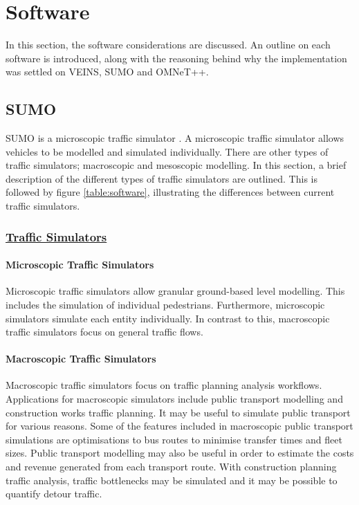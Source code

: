 \section{Software}
In this section, the software considerations are discussed. An outline on each software is introduced, along with the reasoning behind why the implementation was settled on VEINS, SUMO and OMNeT++.

\subsection{SUMO}\label{ssec:SUMO_SOFTWARE}
SUMO is a microscopic traffic simulator \citep{SUMO2012}. A microscopic traffic simulator allows vehicles to be modelled and simulated individually. There are other types of traffic simulators; macroscopic and mesoscopic modelling. In this section, a brief description of the different types of traffic simulators are outlined. This is followed by figure \ref{table:software}, illustrating the differences between current traffic simulators.

\subsubsection{\underline{Traffic Simulators}}
\paragraph{Microscopic Traffic Simulators}
Microscopic traffic simulators allow granular ground-based level modelling. This includes the simulation of individual pedestrians. Furthermore, microscopic simulators simulate each entity individually. In contrast to this, macroscopic traffic simulators focus on general traffic flows. 

\paragraph{Macroscopic Traffic Simulators}
Macroscopic traffic simulators focus on traffic planning analysis workflows. Applications for macroscopic simulators include public transport modelling and construction works traffic planning. It may be useful to simulate public transport for various reasons. Some of the features included in macroscopic public transport simulations are optimisations to bus routes to minimise transfer times and fleet sizes. Public transport modelling may also be useful in order to estimate the costs and revenue generated from each transport route. With construction planning traffic analysis, traffic bottlenecks may be simulated and it may be possible to quantify detour traffic.

